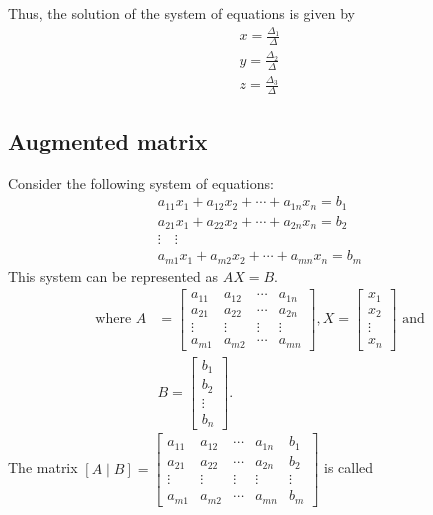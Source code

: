 Thus, the solution of the system of equations is given by
$$
\begin{array}{l}
	x=\frac{\Delta_{1}}{\Delta} \\
	y=\frac{\Delta_{2}}{\Delta} \\
	z=\frac{\Delta_{3}}{\Delta}
\end{array}
$$\subsection{Augmented matrix}
Consider the following system of equations:
$$
\begin{array}{c}
	a_{11} x_{1}+a_{12} x_{2}+\cdots+a_{1 n} x_{n}=b_{1} \\
	a_{21} x_{1}+a_{22} x_{2}+\cdots+a_{2 n} x_{n}=b_{2} \\
	\vdots \quad \vdots \\
	a_{m 1} x_{1}+a_{m 2} x_{2}+\cdots+a_{m n} x_{n}=b_{m}
\end{array}
$$
This system can be represented as $A X=B$.
$$
\begin{aligned}
	\text { where } A &=\left[\begin{array}{cccc}
		a_{11} & a_{12} & \cdots & a_{1 n} \\
		a_{21} & a_{22} & \cdots & a_{2 n} \\
		\vdots & \vdots & \vdots & \vdots \\
		a_{m 1} & a_{m 2} & \cdots & a_{m n}
	\end{array}\right], X=\left[\begin{array}{l}
		x_{1} \\
		x_{2} \\
		\vdots \\
		x_{n}
	\end{array}\right] \text { and } \\
	& B=\left[\begin{array}{c}
		b_{1} \\
		b_{2} \\
		\vdots \\
		b_{n}
	\end{array}\right] .
\end{aligned}
$$
The matrix $[A \mid B]=\left[\begin{array}{cccc|c}a_{11} & a_{12} & \cdots & a_{1 n} & b_{1} \\ a_{21} & a_{22} & \cdots & a_{2 n} & b_{2} \\ \vdots & \vdots & \vdots & \vdots & \vdots \\ a_{m 1} & a_{m 2} & \cdots & a_{m n} & b_{m}\end{array}\right]$ is called
